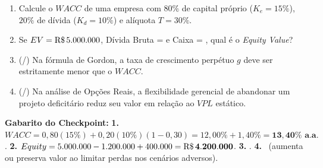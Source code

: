 \begin{boxTeste}
\begin{enumerate}[leftmargin=1.5em, itemsep=4pt]
  \item Calcule o $WACC$ de uma empresa com $80\%$ de capital próprio ($K_e = 15\%$), $20\%$ de dívida ($K_d = 10\%$) e alíquota $T = 30\%$.
  \item Se $EV = \text{R\$\,}{5.000.000}$, Dívida Bruta =  e Caixa = , qual é o \textit{Equity Value}?
  \item (\V/\F) Na fórmula de Gordon, a taxa de crescimento perpétuo $g$ deve ser estritamente menor que o $WACC$.
  \item (\V/\F) Na análise de Opções Reais, a flexibilidade gerencial de abandonar um projeto deficitário reduz seu valor em relação ao $VPL$ estático.
\end{enumerate}
\vspace{4pt}
\noindent\textbf{Gabarito do Checkpoint:} \textbf{1.} $WACC = 0{,}80(15\%) + 0{,}20(10\%)(1 - 0{,}30) = 12{,}00\% + 1{,}40\% = \mathbf{13{,}40\%\text{ a.a.}}$. \quad \textbf{2.} $Equity = 5.000.000 - 1.200.000 + 400.000 = \mathbf{\text{R\$\,}{4.200.000}}$. \quad \textbf{3.} \V. \quad \textbf{4.} \F\ (aumenta ou preserva valor ao limitar perdas nos cenários adversos).
\end{boxTeste}
